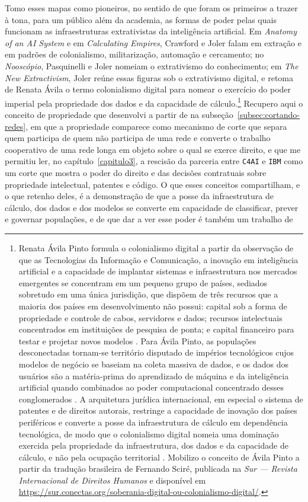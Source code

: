 Tomo esses mapas como pioneiros, no sentido de que foram os primeiros a trazer à tona, para um público além da academia, as formas de poder pelas quais funcionam as infraestruturas extrativistas da inteligência artificial. Em \textit{Anatomy of an AI System} e em \textit{Calculating Empires}, Crawford e Joler falam em extração e em padrões de colonialismo, militarização, automação e cercamento; no \textit{Nooscópio}, Pasquinelli e Joler nomeiam o extrativismo do conhecimento; em \textit{The New Extractivism}, Joler reúne essas figuras sob o extrativismo digital, e retoma de Renata Ávila o termo colonialismo digital para nomear o exercício do poder imperial pela propriedade dos dados e da capacidade de cálculo.\footnote{Renata Ávila Pinto formula o colonialismo digital a partir da observação de que as Tecnologias da Informação e Comunicação, a inovação em inteligência artificial e a capacidade de implantar sistemas e infraestrutura nos mercados emergentes se concentram em um pequeno grupo de países, sediados sobretudo em uma única jurisdição, que dispõem de três recursos que a maioria dos países em desenvolvimento não possui: capital sob a forma de propriedade e controle de cabos, servidores e dados; recursos intelectuais concentrados em instituições de pesquisa de ponta; e capital financeiro para testar e projetar novos modelos \parencite[pp.~16--17]{AvilaPinto2018Soberania}. Para Ávila Pinto, as populações desconectadas tornam-se território disputado de impérios tecnológicos cujos modelos de negócio se baseiam na coleta massiva de dados, e os dados dos usuários são a matéria-prima do aprendizado de máquina e da inteligência artificial quando combinados ao poder computacional concentrado desses conglomerados \parencite[p.~18]{AvilaPinto2018Soberania}. A arquitetura jurídica internacional, em especial o sistema de patentes e de direitos autorais, restringe a capacidade de inovação dos países periféricos e converte a posse da infraestrutura de cálculo em dependência tecnológica, de modo que o colonialismo digital nomeia uma dominação exercida pela propriedade da infraestrutura, dos dados e da capacidade de cálculo, e não pela ocupação territorial \parencite[pp.~17, 21]{AvilaPinto2018Soberania}. Mobilizo o conceito de Ávila Pinto a partir da tradução brasileira de Fernando Sciré, publicada na \textit{Sur — Revista Internacional de Direitos Humanos} e disponível em \url{https://sur.conectas.org/soberania-digital-ou-colonialismo-digital/}.} Recupero aqui o conceito de propriedade que desenvolvi a partir de \textcite{strathern2011cortando} na subseção~\ref{subsec:cortando-redes}, em que a propriedade comparece como mecanismo de corte que separa quem participa de quem não participa de uma rede e converte o trabalho cooperativo de uma rede longa em objeto sobre o qual se exerce direito, e que me permitiu ler, no capítulo~\ref{capitulo3}, a rescisão da parceria entre \texttt{C4AI} e \texttt{IBM} como um corte que mostra o poder do direito e das decisões contratuais sobre propriedade intelectual, patentes e código. O que esses conceitos compartilham, e o que retenho deles, é a demonstração de que a posse da infraestrutura de cálculo, dos dados e dos modelos se converte em capacidade de classificar, prever e governar populações, e de que dar a ver esse poder é também um trabalho de 